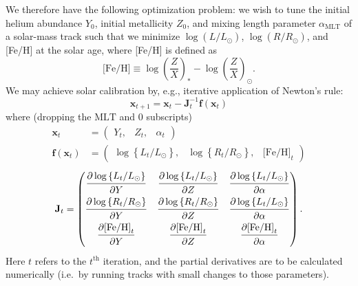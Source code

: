 We therefore have the following optimization problem: 
we wish to tune the initial helium abundance $Y_0$, initial metallicity $Z_0$, and mixing length parameter $\alpha_{\text{MLT}}$ of a solar-mass track such that we minimize ${\log\left(L/L_\odot\right)}$,  ${\log\left(R/R_\odot\right)}$, and [Fe/H] at the solar age, where [Fe/H] is defined as
\begin{equation}
    \text{[Fe/H]}
    \equiv
    \log\left( \frac{Z}{X} \right)_\ast
    -
    \log\left( \frac{Z}{X} \right)_\odot.
\end{equation}
We may achieve solar calibration by, e.g., iterative application of Newton's rule: 
\begin{equation}
    \mathbf{x}_{t+1}
    =
    \mathbf{x}_t - \mathbf{J}_t^{-1} \mathbf{f}(\mathbf{x}_t)
\end{equation}
where (dropping the $\text{MLT}$ and $0$ subscripts)
\begin{align}
    \mathbf{x}_t
    &=
    \begin{pmatrix} Y_t , & Z_t , & \alpha_t \end{pmatrix}
    \\
    \mathbf{f}(\mathbf{x}_t)
    &=
    \begin{pmatrix} 
        \log \left\{ L_t/L_\odot \right\}, &
        \log \left\{ R_t/R_\odot \right\}, &
        \text{[Fe/H]}_t
    \end{pmatrix}
\end{align}
\begin{equation}
    \mathbf{J}_t
    =
    \begin{pmatrix} 
        \dfrac{\strut\partial \log \left\{ L_t/L_\odot \right\}}{\strut\partial Y} &
        \dfrac{\strut\partial \log \left\{ L_t/L_\odot \right\}}{\strut\partial Z} &
        \dfrac{\strut\partial \log \left\{ L_t/L_\odot \right\}}{\strut\partial \alpha}\\
        \dfrac{\strut\partial \log \left\{ R_t/R_\odot \right\}}{\strut\partial Y} &
        \dfrac{\strut\partial \log \left\{ R_t/R_\odot \right\}}{\strut\partial Z} &
        \dfrac{\strut\partial \log \left\{ L_t/L_\odot \right\}}{\strut\partial \alpha}\\
        \dfrac{\strut\partial \text{[Fe/H]}_t}{\strut\partial Y} &
        \dfrac{\strut\partial \text{[Fe/H]}_t}{\strut\partial Z} &
        \dfrac{\strut\partial \text{[Fe/H]}_t}{\strut\partial \alpha}
    \end{pmatrix}.
\end{equation}
Here $t$ refers to the $t^{\text{th}}$ iteration, and the partial derivatives are to be calculated numerically (i.e.\ by running tracks with small changes to those parameters). 
